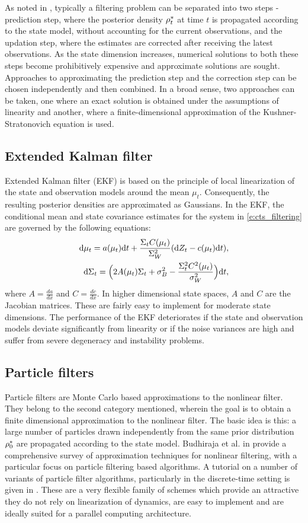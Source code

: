 As noted in , typically a filtering problem can be separated into two steps - prediction step, where the posterior density $\rho^*_t$ at time $t$ is propagated according to the state model, without accounting for the current observations, and the updation step, where the estimates are corrected after receiving the latest observations. As the state dimension increases, numerical solutions to both these steps become prohibitively expensive and approximate solutions are sought. Approaches to approximating the prediction step and the correction step can be chosen independently and then combined. In a broad sense, two approaches can be taken, one where an exact solution is obtained under the assumptions of linearity and another, where a finite-dimensional approximation of the Kushner-Stratonovich equation is used.  
\subsection{Extended Kalman filter}
\label{s:ekf}
Extended Kalman filter (EKF) \cite{jaz70} is based on the principle of local linearization of the state and observation models around the mean $\mu_t$. Consequently, the resulting posterior densities are approximated as Gaussians. In the EKF, the conditional mean and state covariance estimates for the system in \eqref{e:cts_filtering} are governed by the following equations: 
\begin{align}
\ud \mu_t = a(\mu_t) \ud t + \frac{\Sigma_t C(\mu_t)}{\Sigma^2_W} (\ud Z_t - c(\mu_t) \ud t), \\
\ud \Sigma_t = \Bigl(2 A(\mu_t) \Sigma_t  + \sigma^2_B - \frac{\Sigma^2_t C^2(\mu_t)}{\sigma^2_W}\Bigr) \ud t, 
\label{e:ekf}
\end{align}
where $A = \frac{d a}{dx}$ and $C = \frac{d c}{dx}$. In higher dimensional state spaces, $A$ and $C$ are the Jacobian matrices. These are fairly easy to implement for moderate state dimensions. The performance of the EKF deteriorates if the state and observation models deviate significantly from linearity or if the noise variances are high and suffer from severe degeneracy and instability problems. 
\subsection{Particle filters}
\label{e:particle}
Particle filters are Monte Carlo based approximations to the nonlinear filter. They belong to the second category mentioned, wherein the goal is to obtain a finite dimensional approximation to the nonlinear filter. The basic idea is this: a large number of particles drawn independently from the same prior distribution $\rho^*_0$ are propagated according to the state model. 
Budhiraja et al. in \cite{budchelee07} provide a comprehensive survey of approximation techniques for nonlinear filtering, with a particular focus on particle filtering based algorithms. A tutorial on a number of variants of particle filter algorithms, particularly in the discrete-time setting is given in \cite{arumasgorcla02}. These are a very flexible family of schemes which provide an attractive they do not rely on linearization
of dynamics, are easy to implement and are ideally suited for a parallel computing architecture.
